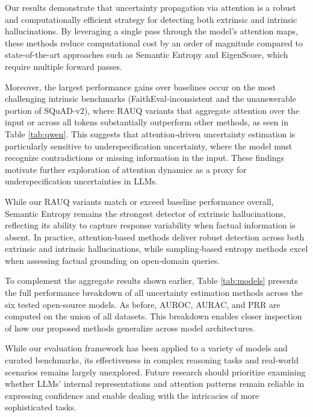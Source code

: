 \documentclass[letterpaper]{article} %
\begin{document}
Our results demonstrate that uncertainty propagation via attention is a robust and computationally efficient strategy for detecting both extrinsic and intrinsic hallucinations. By leveraging a single pass through the model’s attention maps, these methods reduce computational cost by an order of magnitude compared to state-of-the-art approaches such as Semantic Entropy and EigenScore, which require multiple forward passes.

Moreover, the largest performance gains over baselines occur on the most challenging intrinsic benchmarks (FaithEval‑inconsistent and the unanswerable portion of SQuAD‑v2), where RAUQ variants that aggregate attention over the input or across all tokens substantially outperform other methods, as seen in Table \ref{tab:qwen}. This suggests that attention‐driven uncertainty estimation is particularly sensitive to underspecification uncertainty, where the model must recognize contradictions or missing information in the input. These findings motivate further exploration of attention dynamics as a proxy for underspecification uncertainties in LLMs.

While our RAUQ variants match or exceed baseline performance overall, Semantic Entropy remains the strongest detector of extrinsic hallucinations, reflecting its ability to capture response variability when factual information is absent. In practice, attention‑based methods deliver robust detection across both extrinsic and intrinsic hallucinations, while sampling‐based entropy methods excel when assessing factual grounding on open‐domain queries.

To complement the aggregate results shown earlier, Table \ref{tab:models} presents the full performance breakdown of all uncertainty estimation methods across the six tested open-source models. As before, AUROC, AURAC, and PRR are computed on the union of all datasets. This breakdown enables closer inspection of how our proposed methods generalize across model architectures.


While our evaluation framework has been applied to a variety of models and curated benchmarks, its effectiveness in complex reasoning tasks and real-world scenarios remains largely unexplored. Future research should prioritize examining whether LLMs' internal representations and attention patterns remain reliable in expressing confidence and enable dealing with the intricacies of more sophisticated tasks.

\newcommand{\metricblock}[3]{\begin{tabular}{@{}c@{}}#1\\#2\\#3\end{tabular}}
\newcommand{\metricblockbold}[3]{\textbf{\begin{tabular}{@{}c@{}}#1\\#2\\#3\end{tabular}}}
\end{document}
